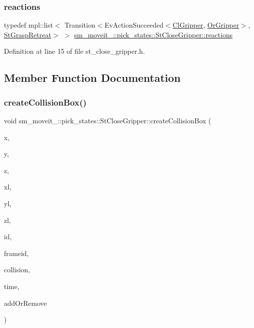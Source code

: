 \subsubsection{\texorpdfstring{reactions}{reactions}}
{\footnotesize\ttfamily typedef mpl\+::list$<$ Transition$<$Ev\+Action\+Succeeded$<$\hyperlink{classsm__moveit__4_1_1cl__gripper_1_1ClGripper}{Cl\+Gripper}, \hyperlink{classsm__moveit__4_1_1OrGripper}{Or\+Gripper}$>$, \hyperlink{structsm__moveit__4_1_1pick__states_1_1StGraspRetreat}{St\+Grasp\+Retreat}$>$ $>$ \hyperlink{structsm__moveit__4_1_1pick__states_1_1StCloseGripper_a6934886ed914236301c2341e96264729}{sm\+\_\+moveit\+\_\+::pick\+\_\+states\+::\+St\+Close\+Gripper\+::reactions}}



Definition at line 15 of file st\+\_\+close\+\_\+gripper.\+h.



\subsection{Member Function Documentation}
\mbox{\label{structsm__moveit__4_1_1pick__states_1_1StCloseGripper_a7522e4d331379b935519d24fd34ce39d}} 
\subsubsection{\texorpdfstring{create\+Collision\+Box()}{createCollisionBox()}}
{\footnotesize\ttfamily void sm\+\_\+moveit\+\_\+::pick\+\_\+states\+::\+St\+Close\+Gripper\+::create\+Collision\+Box (\begin{DoxyParamCaption}\item[{float}]{x,  }\item[{float}]{y,  }\item[{float}]{z,  }\item[{float}]{xl,  }\item[{float}]{yl,  }\item[{float}]{zl,  }\item[{std\+::string}]{id,  }\item[{std\+::string}]{frameid,  }\item[{moveit\+\_\+msgs\+::\+Collision\+Object \&}]{collision,  }\item[{const ros\+::\+Time \&}]{time,  }\item[{int}]{add\+Or\+Remove }\end{DoxyParamCaption})\hspace{0.3cm}{\ttfamily [inline]}}




